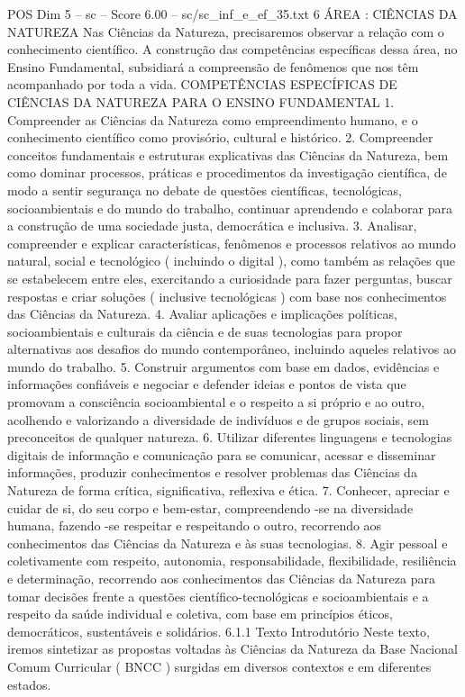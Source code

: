 \begin{textsample}{POS Dim 5 – sc – Score 6.00 – sc/sc\_inf\_e\_ef\_35.txt}  \label{ex:f5_pos_034}
6 ÁREA : CIÊNCIAS DA NATUREZA Nas Ciências da Natureza, precisaremos observar a relação com o conhecimento científico.
A construção das competências específicas dessa área, no Ensino Fundamental, subsidiará a compreensão de fenômenos que nos têm acompanhado por toda a vida.
COMPETÊNCIAS ESPECÍFICAS DE CIÊNCIAS DA NATUREZA PARA O ENSINO FUNDAMENTAL 1.
Compreender as Ciências da Natureza como empreendimento humano, e o conhecimento científico como provisório, cultural e histórico. 2.
Compreender conceitos fundamentais e estruturas explicativas das Ciências da Natureza, bem como dominar processos, práticas e procedimentos da investigação científica, de modo a sentir segurança no debate de questões científicas, tecnológicas, socioambientais e do mundo do trabalho, continuar aprendendo e colaborar para a construção de uma sociedade justa, democrática e inclusiva. 3.
Analisar, compreender e explicar características, fenômenos e processos relativos ao mundo natural, social e tecnológico ( incluindo o digital ), como também as relações que se estabelecem entre eles, exercitando a curiosidade para fazer perguntas, buscar respostas e criar soluções ( inclusive tecnológicas ) com base nos conhecimentos das Ciências da Natureza. 4.
Avaliar aplicações e implicações políticas, socioambientais e culturais da ciência e de suas tecnologias para propor alternativas aos desafios do mundo contemporâneo, incluindo aqueles relativos ao mundo do trabalho. 5.
Construir argumentos com base em dados, evidências e informações confiáveis e negociar e defender ideias e pontos de vista que promovam a consciência socioambiental e o respeito a si próprio e ao outro, acolhendo e valorizando a diversidade de indivíduos e de grupos sociais, sem preconceitos de qualquer natureza. 6.
Utilizar diferentes linguagens e tecnologias digitais de informação e comunicação para se comunicar, acessar e disseminar informações, produzir conhecimentos e resolver problemas das Ciências da Natureza de forma crítica, significativa, reflexiva e ética. 7.
Conhecer, apreciar e cuidar de si, do seu corpo e bem-estar, compreendendo -se na diversidade humana, fazendo -se respeitar e respeitando o outro, recorrendo aos conhecimentos das Ciências da Natureza e às suas tecnologias. 8.
Agir pessoal e coletivamente com respeito, autonomia, responsabilidade, flexibilidade, resiliência e determinação, recorrendo aos conhecimentos das Ciências da Natureza para tomar decisões frente a questões científico-tecnológicas e socioambientais e a respeito da saúde individual e coletiva, com base em princípios éticos, democráticos, sustentáveis e solidários. 6.1.1 Texto Introdutório Neste texto, iremos sintetizar as propostas voltadas às Ciências da Natureza da Base Nacional Comum Curricular ( BNCC ) surgidas em diversos contextos e em diferentes estados.

\end{textsample}
